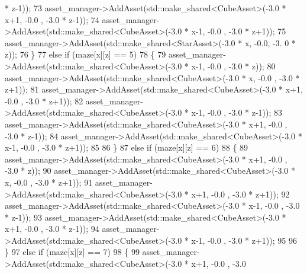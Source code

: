 \begin{DoxyCode}
       * z-1)); 
73                                 asset\_manager->AddAsset(std::make\_shared<CubeAsset>(-3.0 * x+1, -0.0 , -3.0
       * z-1)); 
74                                 asset\_manager->AddAsset(std::make\_shared<CubeAsset>(-3.0 * x-1, -0.0 , -3.0
       * z+1)); 
75                                     asset\_manager->AddAsset(std::make\_shared<StarAsset>(-3.0 * x, -0.0, -3.
      0 * z));
76                             \}
77                         \textcolor{keywordflow}{else} \textcolor{keywordflow}{if} (maze[x][z] == 5)
78                             \{   
79                                 asset\_manager->AddAsset(std::make\_shared<CubeAsset>(-3.0 * x-1, -0.0 , -3.0
       * z)); 
80                                 asset\_manager->AddAsset(std::make\_shared<CubeAsset>(-3.0 * x,   -0.0 , -3.0
       * z+1));
81                                 asset\_manager->AddAsset(std::make\_shared<CubeAsset>(-3.0 * x+1, -0.0 , -3.0
       * z+1)); 
82                                 asset\_manager->AddAsset(std::make\_shared<CubeAsset>(-3.0 * x-1, -0.0 , -3.0
       * z-1)); 
83                                 asset\_manager->AddAsset(std::make\_shared<CubeAsset>(-3.0 * x+1, -0.0 , -3.0
       * z-1)); 
84                                 asset\_manager->AddAsset(std::make\_shared<CubeAsset>(-3.0 * x-1, -0.0 , -3.0
       * z+1)); 
85 
86                             \}
87                         \textcolor{keywordflow}{else} \textcolor{keywordflow}{if} (maze[x][z] == 6)
88                             \{   
89                                 asset\_manager->AddAsset(std::make\_shared<CubeAsset>(-3.0 * x+1, -0.0 , -3.0
       * z)); 
90                                 asset\_manager->AddAsset(std::make\_shared<CubeAsset>(-3.0 * x,   -0.0 , -3.0
       * z+1)); 
91                                 asset\_manager->AddAsset(std::make\_shared<CubeAsset>(-3.0 * x+1, -0.0 , -3.0
       * z+1)); 
92                                 asset\_manager->AddAsset(std::make\_shared<CubeAsset>(-3.0 * x-1, -0.0 , -3.0
       * z-1));
93                                 asset\_manager->AddAsset(std::make\_shared<CubeAsset>(-3.0 * x+1, -0.0 , -3.0
       * z-1));
94                                 asset\_manager->AddAsset(std::make\_shared<CubeAsset>(-3.0 * x-1, -0.0 , -3.0
       * z+1));
95 
96                             \}
97                         \textcolor{keywordflow}{else} \textcolor{keywordflow}{if} (maze[x][z] == 7)
98                             \{       
99                                 asset\_manager->AddAsset(std::make\_shared<CubeAsset>(-3.0 * x+1, -0.0 , -3.0

\end{DoxyCode}
